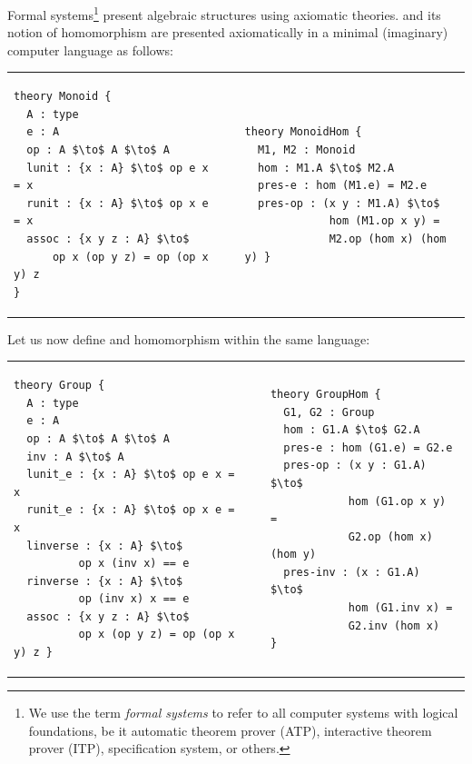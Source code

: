Formal systems\footnote{We use the term \emph{formal systems} to refer to all computer systems with logical foundations, be it automatic theorem prover (ATP), interactive theorem prover (ITP), specification system, or others.} present algebraic structures using axiomatic theories.  and its notion of homomorphism are presented axiomatically in a minimal (imaginary) computer language as follows: \\
\begin{tabular}[t]{p{6.3cm} p{1cm} p{6.3cm}}
\begin{lstlisting}[mathescape, basicstyle=\footnotesize]
theory Monoid { 
  A : type 
  e : A
  op : A $\to$ A $\to$ A
  lunit : {x : A} $\to$ op e x = x 
  runit : {x : A} $\to$ op x e = x 
  assoc : {x y z : A} $\to$ 
      op x (op y z) = op (op x y) z
}
\end{lstlisting}
& &
\begin{lstlisting}[mathescape, basicstyle=\footnotesize]
theory MonoidHom { 
  M1, M2 : Monoid  
  hom : M1.A $\to$ M2.A 
  pres-e : hom (M1.e) = M2.e
  pres-op : (x y : M1.A) $\to$ 
             hom (M1.op x y) = 
             M2.op (hom x) (hom y) }
\end{lstlisting}
\end{tabular}
\newline 
Let us now define  and  homomorphism within the same language: \\
\begin{tabular}[t]{p{6.3cm} p{1cm} p{6.3cm}}
\begin{lstlisting}[mathescape, basicstyle=\footnotesize]
theory Group {
  A : type 
  e : A
  op : A $\to$ A $\to$ A
  inv : A $\to$ A
  lunit_e : {x : A} $\to$ op e x = x
  runit_e : {x : A} $\to$ op x e = x
  linverse : {x : A} $\to$ 
          op x (inv x) == e
  rinverse : {x : A} $\to$ 
          op (inv x) x == e
  assoc : {x y z : A} $\to$ 
          op x (op y z) = op (op x y) z }
\end{lstlisting}
& &
\begin{lstlisting}[mathescape, basicstyle=\footnotesize]
theory GroupHom { 
  G1, G2 : Group 
  hom : G1.A $\to$ G2.A
  pres-e : hom (G1.e) = G2.e
  pres-op : (x y : G1.A) $\to$ 
            hom (G1.op x y) = 
            G2.op (hom x) (hom y)
  pres-inv : (x : G1.A) $\to$ 
            hom (G1.inv x) = 
            G2.inv (hom x)  }
\end{lstlisting}
\end{tabular}

